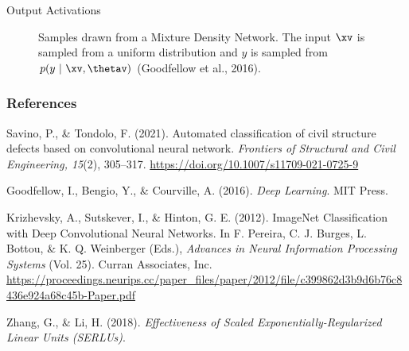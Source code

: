 \begin{frame} {Output Activations}
  \begin{figure}
    \centering
      \caption{\footnotesize Samples drawn from a Mixture Density Network. The input $\xv$ is sampled from a uniform distribution and $y$ is sampled from $p(y~|~\xv,\thetav)$ (Goodfellow et al., 2016).}
  \end{figure}
\end{frame}

\begin{vbframe}
\frametitle{References}
\footnotesize{
\begin{thebibliography}{99}
Savino, P., \& Tondolo, F. (2021). Automated classification of civil structure defects based on convolutional neural network. \textit{Frontiers of Structural and Civil Engineering, 15}(2), 305–317. \url{https://doi.org/10.1007/s11709-021-0725-9}


Goodfellow, I., Bengio, Y., \& Courville, A. (2016). \textit{Deep Learning}. MIT Press.

Krizhevsky, A., Sutskever, I., \& Hinton, G. E. (2012). ImageNet Classification with Deep Convolutional Neural Networks. In F. Pereira, C. J. Burges, L. Bottou, \& K. Q. Weinberger (Eds.), \textit{Advances in Neural Information Processing Systems} (Vol. 25). Curran Associates, Inc. \url{https://proceedings.neurips.cc/paper_files/paper/2012/file/c399862d3b9d6b76c8436e924a68c45b-Paper.pdf}

Zhang, G., \& Li, H. (2018). \textit{Effectiveness of Scaled Exponentially-Regularized Linear Units (SERLUs)}.

\end{thebibliography}
}
\end{vbframe}

\endlecture
